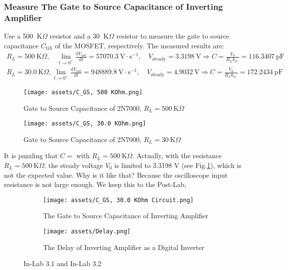 \documentclass[UTF8]{article}
\def\KO{\ \mathrm{K}\Omega}
\def\pF{\ \mathrm{pF}}
\def\KO{\ \mathrm{K}\Omega}
\theoremstyle{MyLineTheoremStyle} %
\theoremstyle{MyBlockTheoremStyle} %
\theoremstyle{MySubsubsectionStyle} %
\begin{document}
\subsubsection{Measure The Gate to Source Capacitance of Inverting Amplifier}
Use a 500 $\KO$ resistor and a 30 $\KO$ resistor to measure the gate to source capacitance $C_{\text{GS}}$ of the MOSFET, respectively. The measured results are:
\begin{gather}
R_L = 500 \KO ,\quad \lim_{t \to 0^+} \frac{\mathrm{d} V_{\text{out}} }{\mathrm{d} t } = 57070.3 \ \mathrm{V\cdot s^{-1}},\quad V_{\text{steady}} =  3.3198 \ \mathrm{V} 
\Longrightarrow C = \frac{V_0}{R_L k_{0^+}} = 116.3407 \pF
\\
R_L = 30.0 \KO ,\lim_{t \to 0^+} \frac{\mathrm{d} V_{\text{out}} }{\mathrm{d} t } = 948889.8 \ \mathrm{V\cdot s^{-1}},\quad V_{\text{steady}} = 4.9032 \ \mathrm{V} 
\Longrightarrow C = \frac{V_0}{R_L k_{0^+}} = 172.2434 \pF
\end{gather}
\begin{figure}[H]\centering
    \texttt{[image: assets/C\_GS, 500 KOhm.png]}
    \caption{Gate to Source Capacitance of 2N7000, $R_L = 500 \KO$}
    \label{500 KOhm}
\end{figure}
\begin{figure}[H]\centering
    \texttt{[image: assets/C\_GS, 30.0 KOhm.png]}
    \caption{Gate to Source Capacitance of 2N7000, $R_L = 30 \KO$}
\end{figure}
It is puzzling that $C = $ with $R_L = 500 \KO$. Actually, with the resistance $R_L = 500 \KO$, the steady voltage $V_0$ is limited to 3.3198 V (see Fig.\ref{500 KOhm}), which is not the expected value. Why is it like that? Because the oscilloscope input resistance is not large enough. We keep this to the Post-Lab, 

\begin{figure}[H]\centering
\begin{subfigure}[b]{0.5\columnwidth}\centering
    \texttt{[image: assets/C\_GS, 30.0 KOhm Circuit.png]}
    \caption{The Gate to Source Capacitance of Inverting Amplifier}
\end{subfigure}\hfill
\begin{subfigure}[b]{0.5\columnwidth}\centering
    \texttt{[image: assets/Delay.png]}
    \caption{The Delay of Inverting Amplifier as a Digital Inverter}
\end{subfigure}
\caption{In-Lab 3.1 and In-Lab 3.2}
\label{In-Lab 3.1 and In-Lab 3.2}
\end{figure}
\end{document}
